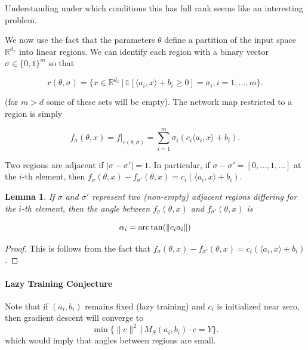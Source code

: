 \documentclass{article}
\newtheorem{lemma}[theorem]{Lemma}
\newcommand{\RR}{\mathbb{R}}
\begin{document}
Understanding under which conditions this has full rank seems like an interesting problem.

\vspace{.5cm}


We now use the fact that the parameters $\theta$ define a partition of the input space
$\RR^{d_x}$ into linear regions. We can identify each region with
a binary vector $\sigma \in \{0,1\}^m$ so that

\begin{equation}
r(\theta,\sigma) = \{x \in \RR^{d_x} \, | \, 
\mathds{1}[\langle a_i,x\rangle + b_i \ge 0] = \sigma_i, i=1,\ldots,m\}.
\end{equation}

(for $m>d$ some of these sets will be empty). The network
map restricted to a region is simply

\begin{equation}
f_\sigma(\theta,x) = f|_{r(\theta,\sigma)} = \sum_{i=1}^m \sigma_i (c_i \langle a_i,x \rangle + b_i).
\end{equation}

Two regions are adjacent if $|\sigma - \sigma'| = 1$. In particular,
if $\sigma - \sigma' = [0,\ldots,1,\ldots]$ at the $i$-th element,
then
$f_\sigma(\theta,x) - f_{\sigma'}(\theta,x) = c_i(\langle a_i,x \rangle + b_i)$.

\begin{lemma}\label{lemma:small_angle} If $\sigma$ and $\sigma'$ represent two (non-empty)
adjacent regions differing for the $i$-th element, then the
\emph{angle} between $f_\sigma(\theta,x)$ and
$f_{\sigma'}(\theta,x)$ is

\begin{equation}
\alpha_i = {\rm arc} \tan(\|c_i a_i\|)
\end{equation}
\end{lemma}

\begin{proof} This is follows from the fact that
$f_\sigma(\theta,x) - f_{\sigma'}(\theta,x) = c_i(\langle a_i,x \rangle + b_i)$.
\end{proof}

\paragraph{Lazy Training Conjecture}
Note that if $(a_i,b_i)$ remains fixed (lazy training) and $c_i$ is
initialized near zero, then gradient descent will converge to
\begin{equation}\label{eq:lin_regress_reg}
\min \{\|c\|^2 \,|\, M_S(a_i,b_i) \cdot c = Y \}.
\end{equation}
which would imply that angles between regions are small.
\end{document}
